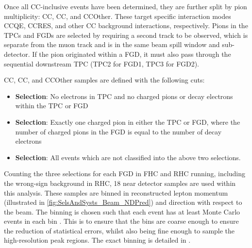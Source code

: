 Once all CC-inclusive events have been determined, they are further split by pion multiplicity: CC\quickmath{0\pi}, CC\quickmath{1\pi}, and CCOther. These target specific interaction modes CCQE, CCRES, and other CC background interactions, respectively. Pions in the TPCs and FGDs are selected by requiring a second track to be observed, which is separate from the muon track and is in the same beam spill window and sub-detector. If the pion originated within a FGD, it must also pass through the sequential downstream TPC (TPC2 for FGD1, TPC3 for FGD2). 

CC\quickmath{0\pi}, CC\quickmath{1\pi}, and CCOther samples are defined with the following cuts:


\begin{itemize}
\item \textbf{ Selection}: No electrons in TPC and no charged pions or decay electrons within the TPC or FGD
\item \textbf{ Selection}: Exactly one charged pion in either the TPC or FGD, where the number of charged pions in the FGD is equal to the number of decay electrons
\item \textbf{ Selection}: All events which are not classified into the above two selections.
\end{itemize}

Counting the three selections for each FGD in FHC and RHC running, including the wrong-sign background in RHC, 18 near detector samples are used within this analysis. These samples are binned in reconstructed lepton momentum (illustrated in \autoref{fig:SelsAndSysts_Beam_NDPred}) and direction with respect to the beam. The binning is chosen such that each event has at least  Monte Carlo events in each bin \cite{thesis_will}. This is to ensure that the bins are coarse enough to ensure the reduction of statistical errors, whilst also being fine enough to sample the high-resolution peak regions. The exact binning is detailed in \cite{thesis_will}.

